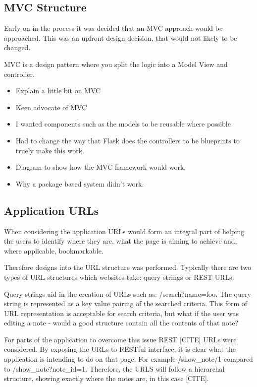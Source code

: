 

\subsection{MVC Structure}
Early on in the process it was decided that an MVC approach would be approached. This was an upfront design decision, that would not likely to be changed.

MVC is a design pattern where you split the logic into a Model View and controller.

\begin{itemize}
  \item Explain a little bit on MVC
  \item Keen advocate of MVC
  \item I wanted components such as the models to be reusable where possible
  \item Had to change the way that Flask does the controllers to be blueprints to truely make this work.
  \item Diagram to show how the MVC framework would work.
  \item Why a package based system didn't work.

\end{itemize}

\subsection{Application URLs}
When considering the application URLs would form an integral part of helping the users to identify where they are, what the page is aiming to achieve and, where applicable, bookmarkable.

Therefore designs into the URL structure was performed. Typically there are two types of URL structures which websites take: query strings or REST URLs.

Query strings aid in the creation of URLs such as: /search?name=foo. The query string is represented as a key value pairing of the searched criteria. This form of URL representation is acceptable for search criteria, but what if the user was editing a note - would a good structure contain all the contents of that note?

For parts of the application to overcome this issue REST [CITE] URLs were considered. By exposing the URLs to RESTful interface, it is clear what the application is intending to do on that page. For example /show_note/1 compared to /show_note?note_id=1. Therefore, the URLS will follow a hierarchal structure, showing exactly where the notes are, in this case [CITE].

